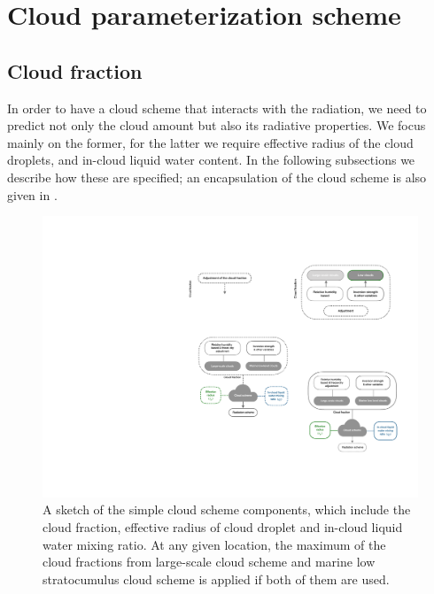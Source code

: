 \section{Cloud parameterization scheme}

\subsection{Cloud fraction}
\label{sec:cld_frac_scheme}

In order to have a cloud scheme that interacts with the radiation, we need to predict not only the cloud amount but also its radiative properties. We focus mainly on the former, for the latter we require effective radius of the cloud droplets, and in-cloud liquid water content. In the following subsections we describe how these are specified; an encapsulation of the cloud scheme is also given in . 

\begin{figure}[t]
	\centering
	\includegraphics[width=0.7\linewidth]{figs/simple_cld_scheme/diag_cld_scheme_summary.pdf}
	\caption[Illustration of simple cloud scheme]{A sketch of the simple cloud scheme components, which include the cloud fraction, effective radius of cloud droplet and in-cloud liquid water mixing ratio. At any given location, the maximum of the cloud fractions from large-scale cloud scheme and marine low stratocumulus cloud scheme is applied if both of them are used.} 
	\label{fig:cld_scheme_summary}
\end{figure}

